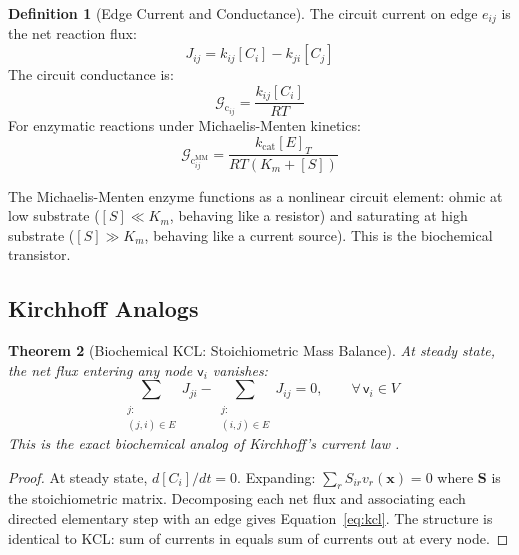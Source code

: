 \documentclass[10pt,twocolumn,a4paper]{article}
\theoremstyle{plain}
\newtheorem{theorem}{Theorem}[section]
\theoremstyle{definition}
\newtheorem{definition}[theorem]{Definition}
\theoremstyle{remark}
\newcommand{\fnode}{\mathsf{v}}
\newcommand{\Gcond}{\mathcal{G}_{\mathrm{c}}}
\begin{document}
\begin{definition}[Edge Current and Conductance]
\label{def:current}
The circuit current on edge $e_{ij}$ is the net reaction flux:
\begin{equation}
    J_{ij} = k_{ij}[C_i] - k_{ji}[C_j]
    \label{eq:current}
\end{equation}
The circuit conductance is:
\begin{equation}
    \Gcond_{ij} = \frac{k_{ij}[C_i]}{RT}
    \label{eq:conductance}
\end{equation}
For enzymatic reactions under Michaelis-Menten kinetics:
\begin{equation}
    \Gcond_{ij}^{\mathrm{MM}} = \frac{k_{\mathrm{cat}}[E]_T}{RT(K_m + [S])}
    \label{eq:mm_conductance}
\end{equation}
\end{definition}

The Michaelis-Menten enzyme functions as a nonlinear circuit element: ohmic at low substrate ($[S] \ll K_m$, behaving like a resistor) and saturating at high substrate ($[S] \gg K_m$, behaving like a current source). This is the biochemical transistor.

\subsection{Kirchhoff Analogs}

\begin{theorem}[Biochemical KCL: Stoichiometric Mass Balance]
\label{thm:kcl}
At steady state, the net flux entering any node $\fnode_i$ vanishes:
\begin{equation}
    \sum_{\substack{j:\\(j,i)\in E}} J_{ji} - \sum_{\substack{j:\\(i,j)\in E}} J_{ij} = 0, \qquad \forall\,\fnode_i \in V
    \label{eq:kcl}
\end{equation}
This is the exact biochemical analog of Kirchhoff's current law \citep{kirchhoff1845}.
\end{theorem}

\begin{proof}
At steady state, $d[C_i]/dt = 0$. Expanding: $\sum_r S_{ir} v_r(\mathbf{x}) = 0$ where $\mathbf{S}$ is the stoichiometric matrix. Decomposing each net flux and associating each directed elementary step with an edge gives Equation~\ref{eq:kcl}. The structure is identical to KCL: sum of currents in equals sum of currents out at every node.
\end{proof}
\end{document}
